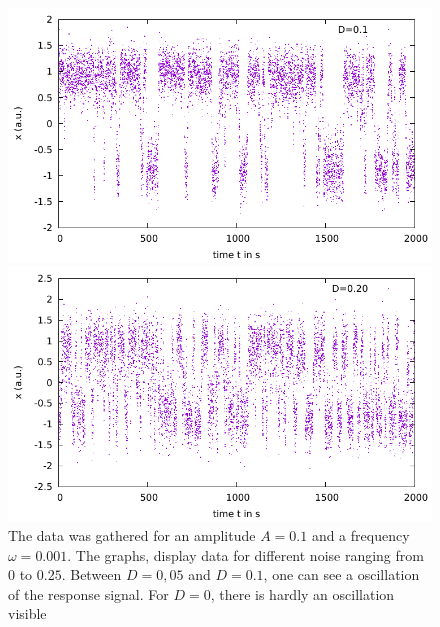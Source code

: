 \documentclass[10pt,fleqn,%
reqno,a4paper]{article}
\begin{document}
\begin{figure}[htpb]
\begin{minipage}[b]{0.5\linewidth}
	\end{minipage} 
	  \begin{minipage}[b]{0.5\linewidth}
	\includegraphics[width=\linewidth]{gnuplot_pictures/final_pictures/Data_plot_D0p1.pdf} 
\end{minipage} 
	  \begin{minipage}[b]{0.5\linewidth}
	\includegraphics[width=\linewidth]{gnuplot_pictures/final_pictures/Data_plot_D0p2.pdf} 
\end{minipage} 
\caption{The data was gathered for an amplitude $A= 0.1$ and a frequency $\omega=0.001$. The graphs, display data for different noise ranging from $0$ to $0.25$. Between $D=0,05$ and $D = 0.1$, one can see a oscillation of the response signal. For $D= 0$, there is hardly an oscillation visible}
\label{pic:data}
\end{figure}

\newpage
\end{document}
